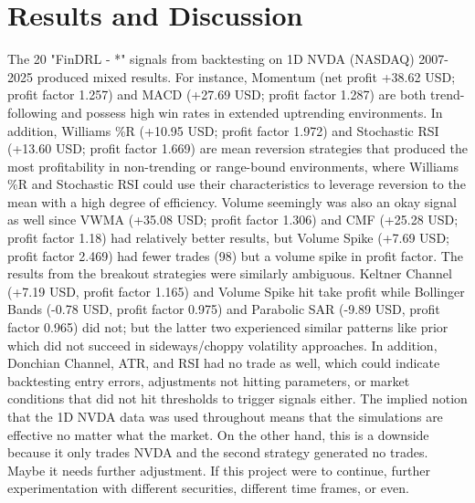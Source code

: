 \section{Results and Discussion}
The 20 "FinDRL - *" signals from backtesting on 1D NVDA (NASDAQ) 2007-2025 produced mixed results. For instance, Momentum (net profit +38.62 USD; profit factor 1.257) and MACD (+27.69 USD; profit factor 1.287) are both trend-following and possess high win rates in extended uptrending environments. In addition, Williams \%R (+10.95 USD; profit factor 1.972) and Stochastic RSI (+13.60 USD; profit factor 1.669) are mean reversion strategies that produced the most profitability in non-trending or range-bound environments, where Williams \%R and Stochastic RSI could use their characteristics to leverage reversion to the mean with a high degree of efficiency. Volume seemingly was also an okay signal as well since VWMA (+35.08 USD; profit factor 1.306) and CMF (+25.28 USD; profit factor 1.18) had relatively better results, but Volume Spike (+7.69 USD; profit factor 2.469) had fewer trades (98) but a volume spike in profit factor.
The results from the breakout strategies were similarly ambiguous. Keltner Channel (+7.19 USD, profit factor 1.165) and Volume Spike hit take profit while Bollinger Bands (-0.78 USD, profit factor 0.975) and Parabolic SAR (-9.89 USD, profit factor 0.965) did not; but the latter two experienced similar patterns like prior which did not succeed in sideways/choppy volatility approaches. In addition, Donchian Channel, ATR, and RSI had no trade as well, which could indicate backtesting entry errors, adjustments not hitting parameters, or market conditions that did not hit thresholds to trigger signals either.
The implied notion that the 1D NVDA data was used throughout means that the simulations are effective no matter what the market. On the other hand, this is a downside because it only trades NVDA and the second strategy generated no trades. Maybe it needs further adjustment. If this project were to continue, further experimentation with different securities, different time frames, or even.

